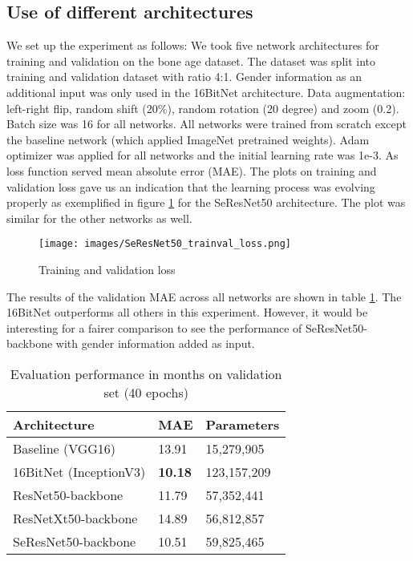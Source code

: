 \documentclass[10pt,twocolumn,letterpaper]{article}
\begin{document}
\subsection{Use of different architectures}
We set up the experiment as follows: We took five network architectures for training and validation on the bone age dataset. The dataset was split into training and validation dataset with ratio 4:1. Gender information as an additional input was only used in the 16BitNet architecture. Data augmentation: left-right flip, random shift (20\%), random rotation (20 degree) and zoom (0.2). Batch size was 16 for all networks. All networks were trained from scratch except the baseline network (which applied ImageNet pretrained weights). Adam optimizer was applied for all networks and the initial learning rate was 1e-3. As loss function served mean absolute error (MAE). The plots on training and validation loss gave us an indication that the learning process was evolving properly as exemplified in figure \ref{fig:lossSeResNet50} for the SeResNet50 architecture. The plot was similar for the other networks as well.

\begin{figure}[h]
\texttt{[image: images/SeResNet50\_trainval\_loss.png]}
\centering
\caption{Training and validation loss}
\label{fig:lossSeResNet50}
\end{figure}

The results of the validation MAE across all networks are shown in table \ref{table:archcomp}. The 16BitNet outperforms all others in this experiment. However, it would be interesting for a fairer comparison to see the performance of SeResNet50-backbone with gender information added as input.

\begin{table}[h]
\begin{center}
\begin{tabular}{|l|l|l|}
\hline
Architecture & MAE & Parameters \\
\hline\hline
Baseline (VGG16) & 13.91 & 15,279,905 \\
16BitNet (InceptionV3) & \textbf{10.18} & 123,157,209 \\
ResNet50-backbone & 11.79 & 57,352,441 \\
ResNetXt50-backbone & 14.89 & 56,812,857 \\
SeResNet50-backbone & 10.51 & 59,825,465 \\
\hline
\end{tabular}
\end{center}
\caption{Evaluation performance in months on validation set (40 epochs)}
\label{table:archcomp}
\end{table}
\end{document}
